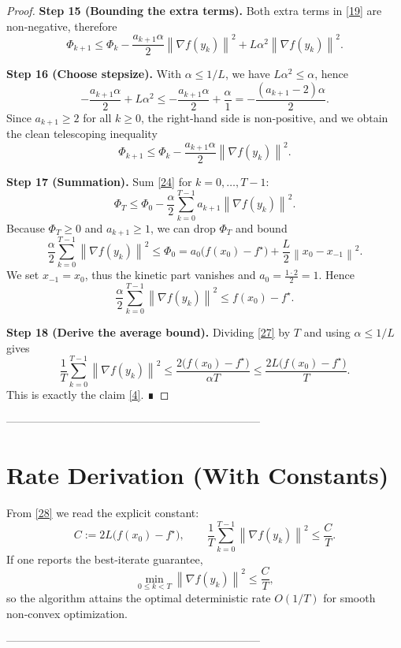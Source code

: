 \documentclass{article}
\newcommand{\norm}[1]{\left\lVert#1\right\rVert}
\newcommand{\grad}{\nabla}
\begin{document}
\begin{proof}
\textbf{Step 15 (Bounding the extra terms).}
Both extra terms in \eqref{19} are non‑negative, therefore
\[
\Phi_{k+1}\le \Phi_k -\frac{a_{k+1}\alpha}{2}\norm{\grad f(y_k)}^{2}
+L\alpha^{2}\norm{\grad f(y_k)}^{2}.
\tag{23}
\]

\textbf{Step 16 (Choose stepsize).}
With $\alpha\le 1/L$, we have $L\alpha^{2}\le\alpha$, hence
\[
-\frac{a_{k+1}\alpha}{2}+L\alpha^{2}
\le -\frac{a_{k+1}\alpha}{2}+\frac{\alpha}{1}
= -\frac{(a_{k+1}-2)\alpha}{2}.
\]
Since $a_{k+1}\ge 2$ for all $k\ge0$, the right‑hand side is non‑positive, and we obtain the clean telescoping inequality
\[
\Phi_{k+1}\le \Phi_k-\frac{a_{k+1}\alpha}{2}\norm{\grad f(y_k)}^{2}.
\tag{24}
\]

\textbf{Step 17 (Summation).}
Sum \eqref{24} for $k=0,\dots,T-1$:
\[
\Phi_T\le \Phi_0-\frac{\alpha}{2}\sum_{k=0}^{T-1}a_{k+1}\norm{\grad f(y_k)}^{2}.
\tag{25}
\]
Because $\Phi_T\ge 0$ and $a_{k+1}\ge 1$, we can drop $\Phi_T$ and bound
\[
\frac{\alpha}{2}\sum_{k=0}^{T-1}\norm{\grad f(y_k)}^{2}
\le \Phi_0
= a_0\bigl(f(x_0)-f^\star\bigr)+\frac{L}{2}\norm{x_0-x_{-1}}^{2}.
\tag{26}
\]
We set $x_{-1}=x_0$, thus the kinetic part vanishes and $a_0=\frac{1\cdot2}{2}=1$.
Hence
\[
\frac{\alpha}{2}\sum_{k=0}^{T-1}\norm{\grad f(y_k)}^{2}
\le f(x_0)-f^\star .
\tag{27}
\]

\textbf{Step 18 (Derive the average bound).}
Dividing \eqref{27} by $T$ and using $\alpha\le 1/L$ gives
\[
\frac{1}{T}\sum_{k=0}^{T-1}\norm{\grad f(y_k)}^{2}
\le \frac{2\bigl(f(x_0)-f^\star\bigr)}{\alpha T}
\le \frac{2L\bigl(f(x_0)-f^\star\bigr)}{T}.
\tag{28}
\]
This is exactly the claim \eqref{4}.  ∎
\end{proof}

---------------------------------------------------------------------

\section*{Rate Derivation (With Constants)}
From \eqref{28} we read the explicit constant:
\[
C:=2L\bigl(f(x_0)-f^\star\bigr),\qquad
\frac{1}{T}\sum_{k=0}^{T-1}\norm{\grad f(y_k)}^{2}\le\frac{C}{T}.
\]
If one reports the best‑iterate guarantee,
\[
\min_{0\le k<T}\norm{\grad f(y_k)}^{2}
\le \frac{C}{T},
\]
so the algorithm attains the optimal deterministic rate $O(1/T)$ for smooth
non‑convex optimization.

---------------------------------------------------------------------
\end{document}
